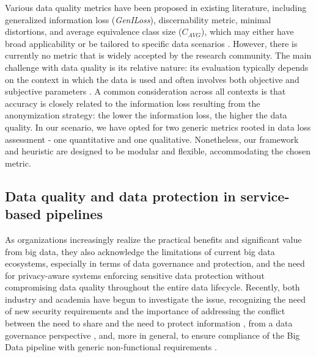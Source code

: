 Various data quality metrics have been proposed in existing literature, including generalized information loss (\textit{GenILoss}), discernability metric, minimal distortions, and average equivalence class size ($C_{AVG}$), which may either have broad applicability or be tailored to specific data scenarios \cite{Majeed2021AnonymizationTF,bookMetrics,reviewMetrics}. However, there is currently no metric that is widely accepted by the research community. The main challenge with data quality is its relative nature: its evaluation typically depends on the context in which the data is used and often involves both objective and subjective parameters \cite{dataAccuracy,dataQuality}.
%
A common consideration across all contexts is that accuracy is closely related to the information loss resulting from the anonymization strategy: the lower the information loss, the higher the data quality. In our scenario, we have opted for two generic metrics rooted in data loss assessment - one quantitative and one qualitative. Nonetheless, our framework and heuristic are designed to be modular and flexible, accommodating the chosen metric.



\subsection{Data quality and data protection in service-based pipelines}\label{sec:datagov}

As organizations increasingly realize the practical benefits and significant value from big data, they also acknowledge the limitations of current big data ecosystems, especially in terms of data governance and protection, and the need for privacy-aware systems enforcing sensitive data protection without compromising data quality throughout the entire data lifecycle. Recently, both industry and academia have begun to investigate the issue, recognizing the need of new security requirements \cite{Colombo:JournCybersec:2019} and the importance of addressing the conflict between the need to share and the need to protect information \cite{balancingact,VANDENBROEK2018330,balancingInMedicine,needtobalance,dataProtection}, from a data governance perspective \cite{al2018exploring,aissa2020decide}, and, more in general, to ensure compliance of the Big Data pipeline with generic non-functional requirements \cite{ABBJ.ICWS2022,ABHKKS.BD2023}.

